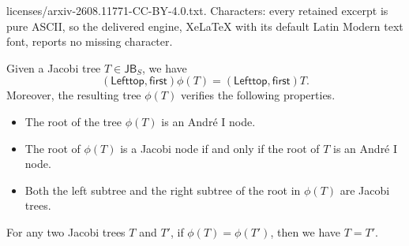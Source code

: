 \documentclass[10pt,a4paper]{amsart}
\def\JB{\mathsf{JB}}
\def\Lefttop{\mathsf{Lefttop}}
\def\first{\mathsf{first}}
\newcommand{\rmnum}[1]{\romannumeral #1}
\begin{document}
licenses/arxiv-2608.11771-CC-BY-4.0.txt. Characters: every retained excerpt is pure ASCII, so the delivered engine, XeLaTeX with its default Latin Modern text font, reports no missing character.
   \begin{lemma}\label{lem-phi}
   	Given  a Jacobi tree $T\in \JB_S$,  we have \begin{equation}\label{eq-phi}
   		(\Lefttop, \first)\phi(T)=(\Lefttop, \first)T.
   	\end{equation} 
   	Moreover, the resulting tree $\phi(T)$ verifies the following  properties.
   	\begin{itemize}
   		\item[\upshape(\rmnum{1})] The root of the tree $\phi(T)$  is an Andr\'e  $\mathrm{I}$ node.
   		
   		\item[\upshape(\rmnum{2})]  The root of $\phi(T)$ is a Jacobi node if and only if the root of $T$ is an  Andr\'e $\mathrm{I}$ node.
   		\item[\upshape(\rmnum{3})]    Both the left subtree and the right subtree of the root in $\phi(T)$ are Jacobi trees.
   		\end{itemize}
   	\end{lemma}

   	 		\begin{lemma}\label{lem-phi-reverse}
   	 		For any two Jacobi trees $T$ and $T'$,  if $\phi(T)=\phi(T')$, then we have $T=T'$. 
   	 	\end{lemma}
\end{document}

